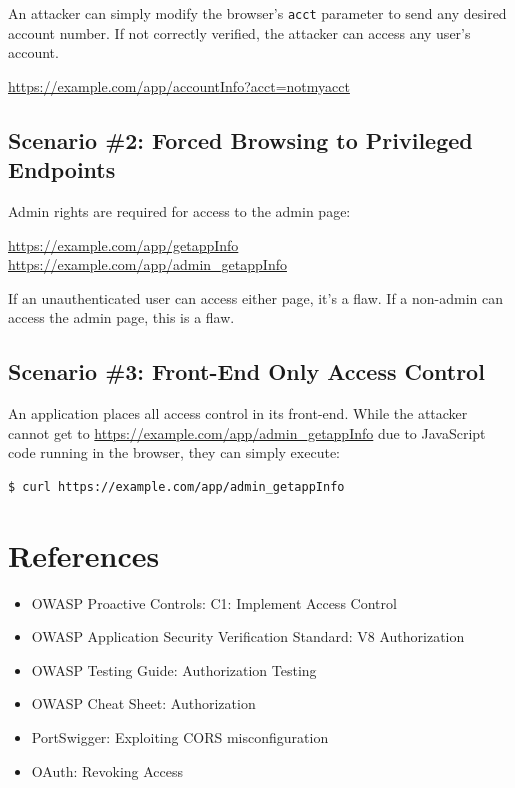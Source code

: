 \documentclass[11pt]{article}
\begin{document}
An attacker can simply modify the browser's \texttt{acct} parameter to send any desired account number. If not correctly verified, the attacker can access any user's account.

\begin{infobox}
\url{https://example.com/app/accountInfo?acct=notmyacct}
\end{infobox}

\subsection{Scenario \#2: Forced Browsing to Privileged Endpoints}
Admin rights are required for access to the admin page:

\begin{infobox}
\url{https://example.com/app/getappInfo}\\
\url{https://example.com/app/admin_getappInfo}
\end{infobox}

If an unauthenticated user can access either page, it's a flaw. If a non-admin can access the admin page, this is a flaw.

\subsection{Scenario \#3: Front-End Only Access Control}
An application places all access control in its front-end. While the attacker cannot get to \url{https://example.com/app/admin_getappInfo} due to JavaScript code running in the browser, they can simply execute:

\begin{codebox}
\begin{verbatim}
$ curl https://example.com/app/admin_getappInfo
\end{verbatim}
\end{codebox}

\section{References}
\begin{itemize}
  \item OWASP Proactive Controls: C1: Implement Access Control
  \item OWASP Application Security Verification Standard: V8 Authorization
  \item OWASP Testing Guide: Authorization Testing
  \item OWASP Cheat Sheet: Authorization
  \item PortSwigger: Exploiting CORS misconfiguration
  \item OAuth: Revoking Access
\end{itemize}
\end{document}
